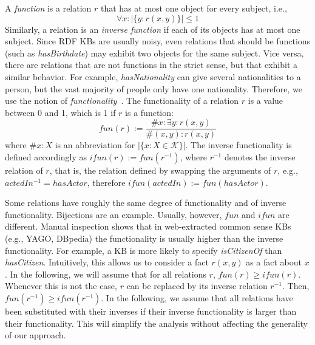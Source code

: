 A \emph{function} is a relation $r$ that has at most one object for every subject, i.e.,
\[
 \forall x: |\{y: r(x,y)\}| \leq 1
\]
% 
Similarly, a relation is an \emph{inverse function} if each of its objects has at most one subject. 
Since RDF KBs are usually noisy, even relations that should be functions (such as \emph{has\-Birthdate}) may exhibit two objects for the same subject.
Vice versa, there are relations that are not functions in the strict sense, but that exhibit a similar behavior.
For example, \emph{has\-Nationality} can give several nationalities to a person, but the vast majority of people only have one nationality.
Therefore, we use the notion of \emph{functionality}~\cite{paris}. The functionality of a relation $r$ is a value between 0 and 1, which is 1 if $r$ is a function:
\[fun(r) := \frac{\#x: \exists y: r(x,y)}{\#(x,y): r(x,y)}\]
where  $\#x:X$ is an abbreviation for $|\{x: X \in \mathcal{K}\}|$.
The inverse functionality is defined accordingly as $ifun(r):=fun(r^{-1})$, where $r^{-1}$ denotes
the inverse relation of $r$, that is, the relation defined by swapping the arguments of $r$, e.g.,
$actedIn^{-1} = hasActor$, therefore $ifun(actedIn):= fun(hasActor)$.


Some relations have roughly the same degree of functionality and of inverse functionality. Bijections are an example.
Usually, however, $fun$ and $ifun$ are different.
Manual inspection shows that in web-extracted common sense KBs (e.g., YAGO, DBpedia) the functionality is usually higher than the inverse functionality.
For example, a KB is more likely to specify \emph{isCitizenOf} than \emph{has\-Citizen}.
Intuitively, this allows us to consider a fact $r(x,y)$ as a fact about $x$.
In the following, we will assume that for all relations $r$, $fun(r)\geq ifun(r)$.
Whenever this is not the case, $r$ can be replaced by its inverse relation $r^{-1}$. Then, $fun(r^{-1})\geq ifun(r^{-1})$.
In the following, we assume that all relations have been substituted with their inverses if their inverse functionality is larger than their functionality.
This will simplify the analysis without affecting the generality of our approach.




